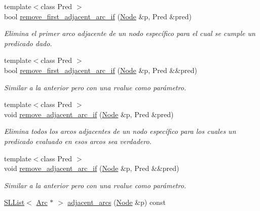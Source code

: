 \begin{DoxyCompactItemize}
{\footnotesize template$<$class Pred $>$ }\\bool \hyperlink{class_designar_1_1_base_graph_ab7c2c2129abb3200b854e23f34e513e8}{remove\+\_\+first\+\_\+adjacent\+\_\+arc\+\_\+if} (\hyperlink{namespace_designar_a5af326c65aa2bd26b26c410f2030d09e}{Node} \&p, Pred \&pred)
\begin{DoxyCompactList}\small\item\em Elimina el primer arco adjacente de un nodo específico para el cual se cumple un predicado dado. \end{DoxyCompactList}\item 
{\footnotesize template$<$class Pred $>$ }\\bool \hyperlink{class_designar_1_1_base_graph_abe36f7676c51362b9a0f560d3c062772}{remove\+\_\+first\+\_\+adjacent\+\_\+arc\+\_\+if} (\hyperlink{namespace_designar_a5af326c65aa2bd26b26c410f2030d09e}{Node} \&p, Pred \&\&pred)
\begin{DoxyCompactList}\small\item\em Similar a la anterior pero con una rvalue como parámetro. \end{DoxyCompactList}\item 
{\footnotesize template$<$class Pred $>$ }\\void \hyperlink{class_designar_1_1_base_graph_af1653bc8e50c53d27997951798a8a716}{remove\+\_\+adjacent\+\_\+arc\+\_\+if} (\hyperlink{namespace_designar_a5af326c65aa2bd26b26c410f2030d09e}{Node} \&p, Pred \&pred)
\begin{DoxyCompactList}\small\item\em Elimina todos los arcos adjacentes de un nodo específico para los cuales un predicado evaluado en esos arcos sea verdadero. \end{DoxyCompactList}\item 
{\footnotesize template$<$class Pred $>$ }\\void \hyperlink{class_designar_1_1_base_graph_a10423075ea81c629e88974fa882ec903}{remove\+\_\+adjacent\+\_\+arc\+\_\+if} (\hyperlink{namespace_designar_a5af326c65aa2bd26b26c410f2030d09e}{Node} \&p, Pred \&\&pred)
\begin{DoxyCompactList}\small\item\em Similar a la anterior pero con una rvalue como parámetro. \end{DoxyCompactList}\item 
\hyperlink{class_designar_1_1_s_l_list}{S\+L\+List}$<$ \hyperlink{namespace_designar_a3f55fb5513d62ff47cbc8f72b8e95d6f}{Arc} $\ast$ $>$ \hyperlink{class_designar_1_1_base_graph_a128e77ef80ed0a40bf307ea06736664b}{adjacent\+\_\+arcs} (\hyperlink{namespace_designar_a5af326c65aa2bd26b26c410f2030d09e}{Node} \&p) const

\end{DoxyCompactItemize}
